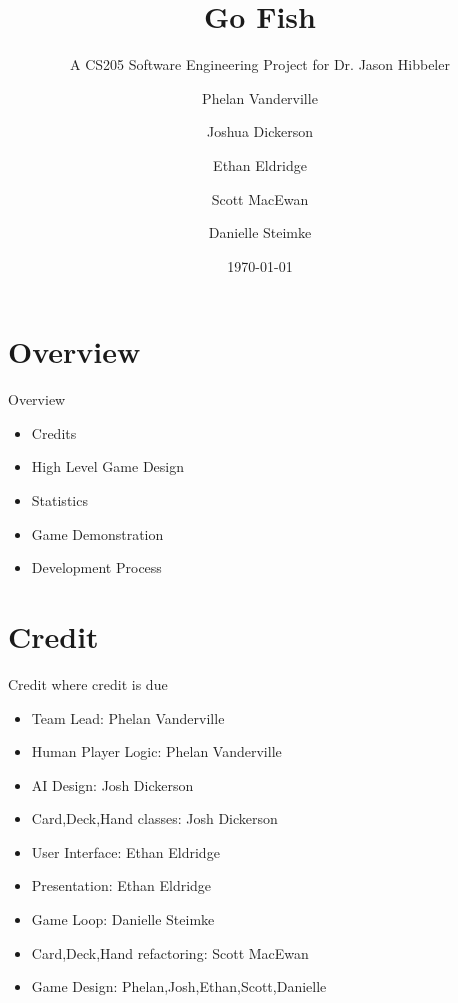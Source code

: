 \documentclass[compress, blue]{beamer}
\begin{document}
\title{Go Fish}   
\subtitle{A CS205 Software Engineering Project for Dr. Jason Hibbeler}
\author[Phelan,Josh,Ethan,Scott,Danielle]{Phelan Vanderville \and Joshua Dickerson \and Ethan Eldridge \and Scott MacEwan\and  Danielle Steimke} 
\date{\today} 



\begin{frame}
\maketitle
\end{frame}

\section{Overview}

\begin{frame}{Overview}

\begin{itemize}
\item<1>Credits
\item<2>High Level Game Design
\item<4>Statistics
\item<5>Game Demonstration
\item<6>Development Process
\end{itemize}

\end{frame}

\section{Credit}

\begin{frame}{Credit where credit is due}
\begin{itemize}
\item<1>Team Lead: Phelan Vanderville
\item<1>Human Player Logic: Phelan Vanderville
\item<2>AI Design: Josh Dickerson
\item<2>Card,Deck,Hand classes: Josh Dickerson
\item<3>User Interface: Ethan Eldridge
\item<3>Presentation: Ethan Eldridge
\item<4>Game Loop: Danielle Steimke
\item<5>Card,Deck,Hand refactoring: Scott MacEwan
\item<6>Game Design: Phelan,Josh,Ethan,Scott,Danielle
\end{itemize}
\end{frame}
\end{document}

